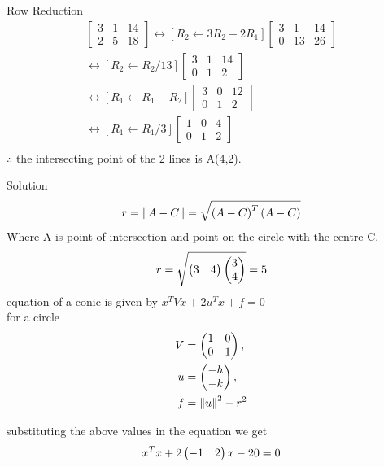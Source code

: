 \documentclass{beamer}
\begin{document}
\begin{frame}{Row Reduction}
    \begin{align*}
        \begin{bmatrix}3 & 1 & 14\\2 & 5 & 18\end{bmatrix}\longleftrightarrow[{R_2 \leftarrow {3R_2-2R_1}}]\begin{bmatrix}3 & 1 & 14\\0 & 13 & 26\end{bmatrix}\\
        \longleftrightarrow[{R_2 \leftarrow {R_2/13}}]\begin{bmatrix}3 & 1 & 14\\0 & 1 & 2\end{bmatrix}\\
        \longleftrightarrow[{R_1 \leftarrow {R_1-R_2}}]\begin{bmatrix}3 & 0 & 12 \\0 & 1 & 2\end{bmatrix}\\
        \longleftrightarrow[{R_1 \leftarrow {R_1/3}}]\begin{bmatrix}1& 0 & 4\\0 & 1 & 2\end{bmatrix}\\
        \end{align*}
        $\therefore$ the intersecting point of the 2 lines is A(4,2).
\end{frame}
\begin{frame}{Solution}
    \begin{align*}
        r = \left\lVert A-C\right\rVert = \sqrt{\left(A-C\right)^T\left(A-C\right)} 
    \end{align*}
    Where A is point of intersection and point on the circle with the centre C.
    \begin{align*}
        r = \sqrt{\begin{pmatrix}3 & 4\end{pmatrix}\begin{pmatrix}3\\4\end{pmatrix}} = 5
    \end{align*}
    equation of a conic is given by  $x^TVx + 2u^Tx + f = 0$\\
     for a circle
    \begin{align*}
     V &= \begin{pmatrix}1&0\\0&1\end{pmatrix},\\ 
    u&=\begin{pmatrix}-h\\-k\end{pmatrix}, \\
    f &= \left\lVert u\right\rVert^2 - r^2\\
    \end{align*}
\end{frame}
    \begin{frame}
        substituting the above values in the equation we get 
    \begin{align*}
    x^Tx + 2\begin{pmatrix}-1 & 2\end{pmatrix}x - 20 = 0
    \end{align*}
    \end{frame}
    
\end{document}
